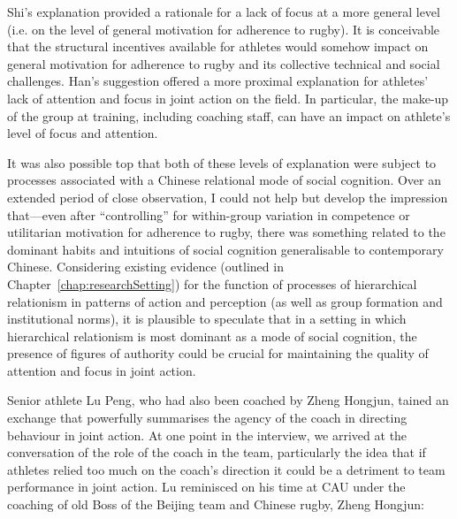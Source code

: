 \begin{CJK}{UTF8}{gbsn}
Shi's explanation provided a rationale for a lack of focus at a more general level (i.e. on the level of general motivation for adherence to rugby).  It is conceivable that the structural incentives available for athletes would somehow impact on general motivation for adherence to rugby and its collective technical and social challenges.  Han's suggestion offered a more proximal explanation for athletes' lack of attention and focus in joint action on the field. In particular, the make-up of the group at training, including coaching staff, can have an impact on athlete's level of focus and attention.


It was also possible top that both of these levels of explanation were subject to processes associated with a Chinese relational mode of social cognition.  Over an extended period of close observation, I could not help but develop the impression that---even after ``controlling'' for within-group variation in competence or utilitarian motivation for adherence to rugby, there was something related to the dominant habits and intuitions of social cognition generalisable to contemporary Chinese.  Considering existing evidence (outlined in Chapter~\ref{chap:researchSetting}) for the function of processes of hierarchical relationism in patterns of action and perception (as well as group formation and institutional norms), it is plausible to speculate that in a setting in which hierarchical relationism is most dominant as a mode of social cognition, the presence of figures of authority could be crucial for maintaining the quality of attention and focus in joint action.

Senior athlete Lu Peng, who had also been coached by Zheng Hongjun, tained an exchange that powerfully summarises the agency of the coach in directing behaviour in joint action.  At one point in the interview, we arrived at the conversation of the role of the coach in the team, particularly the idea that if athletes relied too much on the coach's direction it could be a detriment to team performance in joint action.  Lu reminisced on his time at CAU under the coaching of old Boss of the Beijing team and Chinese rugby, Zheng Hongjun:


\end{CJK}
